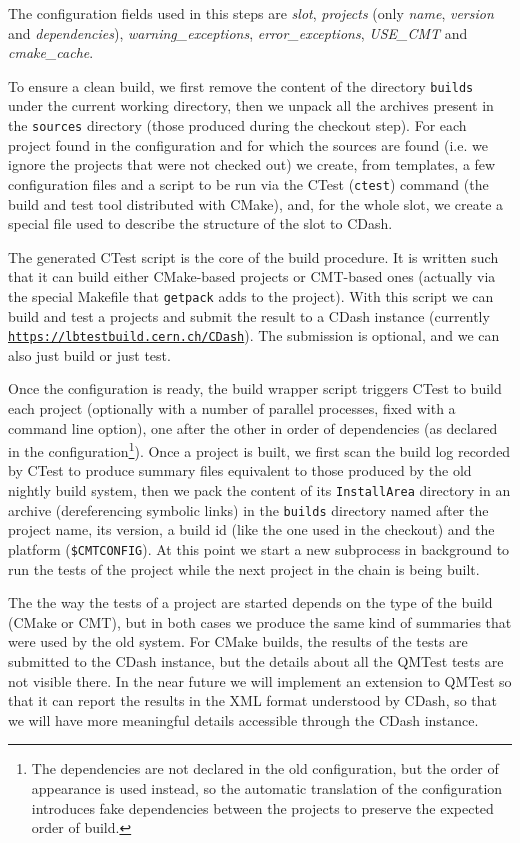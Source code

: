 \documentclass{lhcbnote}
\newcommand{\link}[2]{\href{#1}{#2}}
\newcommand{\urlLink}[1]{\link{#1}{\texttt{#1}}}
\begin{document}
The configuration fields used in this steps are \emph{slot}, \emph{projects}
(only \emph{name}, \emph{version} and \emph{dependencies}),
\emph{warning\_exceptions}, \emph{error\_exceptions}, \emph{USE\_CMT} and
\emph{cmake\_cache}.

To ensure a clean build, we first remove the content of the directory
\texttt{builds} under the current working directory, then we unpack all the
archives present in the \texttt{sources} directory (those produced during the
checkout step).  For each project found in the configuration and for which the
sources are found (i.e. we ignore the projects that were not checked out) we
create, from templates, a few configuration files and a script to be run via the
CTest\cite{CMake} (\texttt{ctest}) command (the build and test tool distributed
with CMake), and, for the whole slot, we create a special file used to describe
the structure of the slot to CDash.

The generated CTest script is the core of the build procedure.  It is written
such that it can build either CMake-based projects or CMT-based\cite{CMT} ones
(actually via the special Makefile that \texttt{getpack} adds to the project).
With this script we can build and test a projects and submit the result to a
CDash instance (currently \urlLink{https://lbtestbuild.cern.ch/CDash}). The
submission is optional, and we can also just build or just test.

Once the configuration is ready, the build wrapper script triggers CTest to
build each project (optionally with a number of parallel processes, fixed with a
command line option), one after the other in order of dependencies (as declared
in the configuration\footnote{The dependencies are not declared in the old
configuration, but the order of appearance is used instead, so the automatic
translation of the configuration introduces fake dependencies between the
projects to preserve the expected order of build.}).  Once a project is built,
we first scan the build log recorded by CTest to produce summary files
equivalent to those produced by the old nightly build system, then we pack the
content of its \texttt{InstallArea} directory in an archive (dereferencing
symbolic links) in the \texttt{builds} directory named after the project name,
its version, a build id (like the one used in the checkout) and the platform
(\texttt{\$CMTCONFIG}).  At this point we start a new subprocess in background
to run the tests of the project while the next project in the chain is being
built.

The the way the tests of a project are started depends on the type of the build
(CMake or CMT), but in both cases we produce the same kind of summaries that
were used by the old system.  For CMake builds, the results of the tests are
submitted to the CDash instance, but the details about all the QMTest tests are
not visible there.  In the near future we will implement an extension to QMTest
so that it can report the results in the XML format understood by CDash, so that
we will have more meaningful details accessible through the CDash instance.
\end{document}
